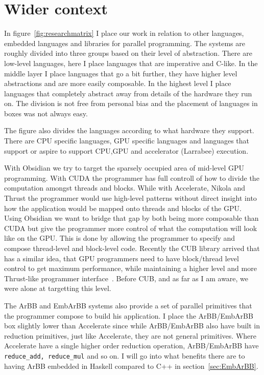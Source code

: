 \documentclass[a4paper]{book}
\begin{document}
\section{Wider context}
\FloatBarrier

In figure~\ref{fig:researchmatrix} I place our work in relation to other languages,
embedded languages and libraries for parallel programming. The systems are roughly divided 
into three groups based on their level of abstraction. There are low-level languages, here 
I place languages that are imperative and C-like. In the middle layer I place languages 
that go a bit further, they have higher level abstractions and are more easily composable. 
In the highest level I place languages that completely abstract away from details of the 
hardware they run on. The division is not free from personal bias and the placement of languages
in boxes was not always easy. 

The figure also divides the languages according to what hardware they support. There 
are CPU specific languages, GPU specific languages and languages that support or aspire 
to support CPU,GPU and accelerator (Larrabee) execution. 

With Obsidian we try to target the sparsely occupied area of mid-level GPU programming. With 
CUDA the programmer has full controll of how to divide the computation amongst threads and 
blocks. While with Accelerate, Nikola and Thrust the programmer would use high-level patterns
without direct insight into how the application would be mapped onto threads and blocks of the 
GPU. Using Obsidian we want to bridge that gap by both being more composable than CUDA 
but give the programmer more control of what the computation will look like on the GPU. This 
is done by allowing the programmer to specify and compose thread-level and block-level code. 
Recently the CUB library arrived that has a similar idea, that GPU programmers need to 
have block/thread level control to get maximum performance, while maintaining a higher level 
and more Thrust-like programmer interface~\citet{CUB}. Before CUB, and as far as I am aware, 
we were alone at targetting this level.  

The ArBB and EmbArBB systems also provide a set of parallel primitives that the programmer
compose to build his application. I place the ArBB/EmbArBB box slightly lower than 
Accelerate since while ArBB/EmbArBB also have built in reduction primitives, just like Accelerate, 
they are not general primitives. Where Accelerate have a single higher order reduction 
operation, ArBB/EmbArBB have {\tt reduce\_add, reduce\_mul} and so on. I will go into 
what benefits there are to having ArBB embedded in Haskell compared to C++ in 
section~\ref{sec:EmbArBB}.
\end{document}
